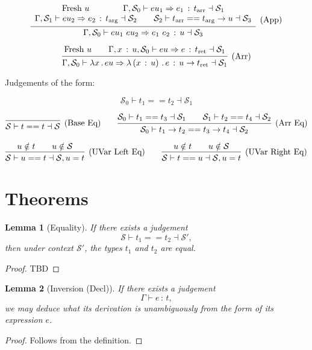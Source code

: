 \documentclass{article}
\newtheorem{lemma}{Lemma}
\newcommand{\G}{\Gamma}
\newcommand{\St}{\mathcal{S}}
\newcommand{\tp}{t}
\newcommand{\tarr}{t_{\text{arr}}}
\newcommand{\targ}{t_{\text{arg}}}
\newcommand{\tret}{t_{\text{ret}}}
\newcommand{\uv}{u}
\newcommand{\eu}{eu}
\newcommand{\e}{e}
\newcommand{\x}{x}
\newcommand{\spc}{\qquad}
\newcommand{\eq}{==}
\renewcommand{\implies}{\Rightarrow}
\newcommand{\fresh}{\text{Fresh}\ }
\newcommand{\withtp}[2]{{#1} \,:\, {#2}}
\newcommand{\app}[2]{{#1}\ {#2}}
\newcommand{\lam}[2]{\lambda {#1} \,.\, {#2}}
\newcommand{\lamtp}[3]{\lambda \left( {\withtp {#1} {#2}} \right) \,.\, {#3}}
\newcommand{\arr}[2]{{#1} \to {#2}}
\newcommand{\hastp}[3]{#1 \vdash {\withtp {#2} {#3}}}
\newcommand{\algtp}[6]{#1, #2 \vdash #3 \implies {\withtp {#4} {#5}} \dashv #6}
\newcommand{\equals}[4]{{#1} \vdash {#2} \eq {#3} \dashv {#4}}
\newcommand{\deduct}[3][]
{
  \begin{prooftree}
    \hypo{#2}
    \infer1[\text{#1}]{#3}
  \end{prooftree}
}
\begin{document}
\[
  \deduct
  {\begin{array}{c}
    \fresh \uv \spc \spc
   \algtp \G {\St_0} {\eu_1} {\e_1} \tarr {\St_1} \\
   \algtp \G {\St_1} {\eu_2} {\e_2} \targ {\St_2} \spc
   \equals {\St_2} {\tarr} {\arr {\targ} \uv} {\St_3}
   \end{array}
  }
  {\algtp \G {\St_0} {\app {\eu_1} {\eu_2}} {\app {\e_1} {\e_2}} {\uv} {\St_3}}
  {\text{(App)}}
\]

\[
  \deduct
  {
    \fresh \uv \spc
    \algtp {\G, \withtp \x {\uv}} {\St_0} \eu \e \tret {\St_1}
  }
  {\algtp \G {\St_0} {\lam \x \eu} {\lamtp \x {\uv} \e} {\arr {\uv} {\tret}} {\St_1}}
  {\text{(Arr)}}
\]

Judgements of the form:

\[ \equals {\St_0} {\tp_1} {\tp_2} {\St_1} \]

\[
  \deduct
  {}
  {\equals \St \tp \tp \St}
  {\text{(Base Eq)}}
  \spc
  \deduct
  {\equals {\St_0} {\tp_1} {\tp_3} {\St_1} \spc
   \equals {\St_1} {\tp_2} {\tp_4} {\St_2}}
  {\equals {\St_0} {\arr {\tp_1} {\tp_2}} {\arr {\tp_3} {\tp_4}} {\St_2}}
  {\text{(Arr Eq)}}
\]

\[
  \deduct
  {\uv \notin \tp \spc \uv \notin \St}
  {\equals \St \uv \tp {\St, \uv = \tp}}
  {\text{(UVar Left Eq)}}
  \spc
  \deduct
  {\uv \notin \tp \spc \uv \notin \St}
  {\equals \St \tp \uv {\St, \uv = \tp}}
  {\text{(UVar Right Eq)}}
\]

\section{Theorems}

\begin{lemma}[Equality]
  If there exists a judgement
  \[ \equals \St {\tp_1} {\tp_2} {\St'},\]
  then under context \(\St'\), the types \(\tp_1\) and \(\tp_2\) are equal.
\end{lemma}

\begin{proof}
  TBD
\end{proof}

\begin{lemma}[Inversion (Decl)]
  If there exists a judgement
  \[ \hastp \G \e \tp,\]
  we may deduce what its derivation is unambiguously from the form of
  its expression \(\e\).
\end{lemma}

\begin{proof}
  Follows from the definition.
\end{proof}
\end{document}
